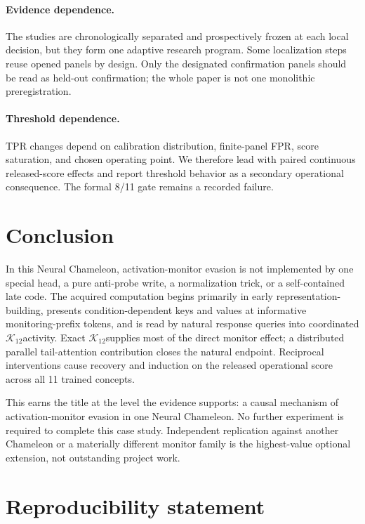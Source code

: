 \documentclass[10pt,twocolumn]{article}
\newcommand{\K}{\ensuremath{\mathcal{K}_{12}}}
\begin{document}
\paragraph{Evidence dependence.}
The studies are chronologically separated and prospectively frozen at each local decision, but they form one adaptive research program. Some localization steps reuse opened panels by design. Only the designated confirmation panels should be read as held-out confirmation; the whole paper is not one monolithic preregistration.

\paragraph{Threshold dependence.}
TPR changes depend on calibration distribution, finite-panel FPR, score saturation, and chosen operating point. We therefore lead with paired continuous released-score effects and report threshold behavior as a secondary operational consequence. The formal 8/11 gate remains a recorded failure.

\section{Conclusion}

In this Neural Chameleon, activation-monitor evasion is not implemented by one special head, a pure anti-probe write, a normalization trick, or a self-contained late code. The acquired computation begins primarily in early representation-building, presents condition-dependent keys and values at informative monitoring-prefix tokens, and is read by natural response queries into coordinated \K activity. Exact \K supplies most of the direct monitor effect; a distributed parallel tail-attention contribution closes the natural endpoint. Reciprocal interventions cause recovery and induction on the released operational score across all 11 trained concepts.

This earns the title at the level the evidence supports: a causal mechanism of activation-monitor evasion in one Neural Chameleon. No further experiment is required to complete this case study. Independent replication against another Chameleon or a materially different monitor family is the highest-value optional extension, not outstanding project work.

\section*{Reproducibility statement}
\end{document}
